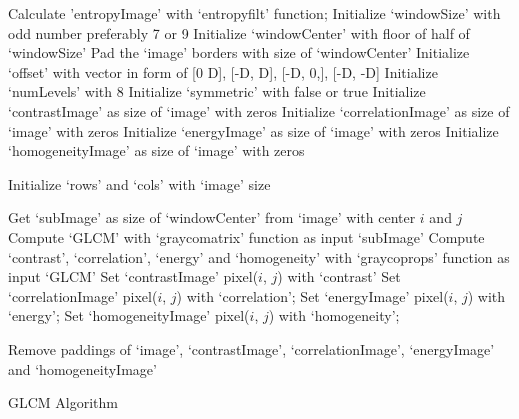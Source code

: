 \documentclass{article}
\begin{document}
\begin{algorithm}[H]
 Calculate 'entropyImage' with ‘entropyfilt’ function;
 Initialize ‘windowSize’ with odd number preferably 7 or 9\;
 Initialize ‘windowCenter’ with floor of half of ‘windowSize’\;
 Pad the ‘image’ borders with size of ‘windowCenter’\;
 Initialize ‘offset’ with vector in form of  [0 D], [-D, D], [-D, 0,], [-D, -D]\; 
 Initialize ‘numLevels’ with 8\;
 Initialize ‘symmetric’ with false or true\;
 Initialize ‘contrastImage’ as size of ‘image’ with zeros\; 
 Initialize ‘correlationImage’ as size of ‘image’ with zeros\; 
 Initialize ‘energyImage’ as size of ‘image’ with zeros\; 
 Initialize ‘homogeneityImage’ as size of ‘image’ with zeros\; 
 
 Initialize ‘rows’ and ‘cols’ with ‘image’ size\;
 
 {
 	 {
 	 	Get ‘subImage’ as size of ‘windowCenter’ from ‘image’ with center $i$ and $j$\;
 	 	Compute ‘GLCM’ with ‘graycomatrix’ function as input ‘subImage’\;
 	 	Compute ‘contrast’, ‘correlation’, ‘energy’ and ‘homogeneity’ with ‘graycoprops’ function as input ‘GLCM’
 	 	Set ‘contrastImage’ pixel($i$, $j$) with ‘contrast’\;
 	 	Set ‘correlationImage’ pixel($i$, $j$) with ‘correlation’;
 	 	Set ‘energyImage’ pixel($i$, $j$) with ‘energy’;
 	 	Set ‘homogeneityImage’ pixel($i$, $j$) with ‘homogeneity’;
 	 }
 }
 
 Remove paddings of ‘image’, ‘contrastImage’, ‘correlationImage’, ‘energyImage’ and ‘homogeneityImage’\;
 
 \caption{GLCM Algorithm}
\end{algorithm}
\end{document}
